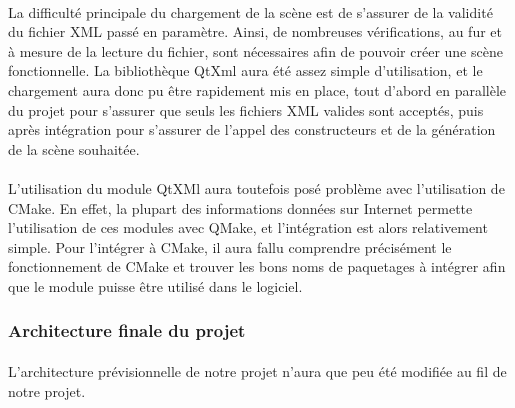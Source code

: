 \paragraph{}
La difficulté principale du chargement de la scène est de s'assurer de la validité du fichier XML passé en paramètre. Ainsi, de nombreuses vérifications, au fur et à mesure de la lecture du fichier, sont nécessaires afin de pouvoir créer une scène fonctionnelle. La bibliothèque QtXml aura été assez simple d'utilisation, et le chargement aura donc pu être rapidement mis en place, tout d'abord en parallèle du projet pour s'assurer que seuls les fichiers XML valides sont acceptés, puis après intégration pour s'assurer de l'appel des constructeurs et de la génération de la scène souhaitée.

\paragraph{}
L'utilisation du module QtXMl aura toutefois posé problème avec l'utilisation de CMake. En effet, la plupart des informations données sur Internet permette l'utilisation de ces modules avec QMake, et l'intégration est alors relativement simple. Pour l'intégrer à CMake, il aura fallu comprendre précisément le fonctionnement de CMake et trouver les bons noms de paquetages à intégrer afin que le module puisse être utilisé dans le logiciel.

\subsubsection{Architecture finale du projet}
\paragraph{}
L'architecture prévisionnelle de notre projet n'aura que peu été modifiée au fil de notre projet.
